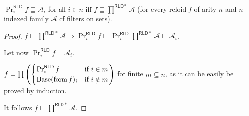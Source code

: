 \begin{thm}
  $\Pr^{\mathsf{RLD}}_i f \sqsubseteq \mathcal{A}_i$ for all $i \in n$
  iff $f \sqsubseteq \prod^{\mathsf{RLD} \ast} \mathcal{A}$ (for every
  reloid $f$ of arity $n$ and $n$-indexed family $\mathcal{A}$ of filters on
  sets).
\end{thm}

\begin{proof}
$f \sqsubseteq \prod^{\mathsf{RLD} \ast} \mathcal{A} \Rightarrow
\Pr^{\mathsf{RLD}}_i f \sqsubseteq \Pr^{\mathsf{RLD}}_i
\prod^{\mathsf{RLD} \ast} \mathcal{A} \sqsubseteq \mathcal{A}_i$.

Let now $\Pr^{\mathsf{RLD}}_i f \sqsubseteq \mathcal{A}_i$.

$f \sqsubseteq \prod \left( \begin{cases}
  \Pr^{\mathsf{RLD}}_i f & \text{if } i \in m\\
  \operatorname{Base} (\operatorname{form} f)_i & \text{if } i \notin m
\end{cases} \right)$ for finite $m \subseteq n$, as it can be easily be
proved by induction.

It follows $f \sqsubseteq \prod^{\mathsf{RLD} \ast} \mathcal{A}$.
\end{proof}

